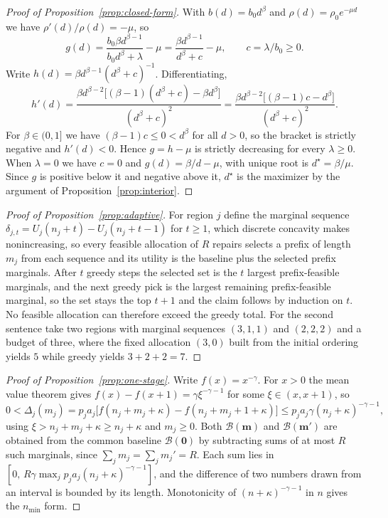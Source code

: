 \documentclass{article}
\begin{document}
\begin{proof}[Proof of Proposition~\ref{prop:closed-form}]
With $b(d)=b_0d^{\beta}$ and $\rho(d)=\rho_0e^{-\mu d}$ we have $\rho'(d)/\rho(d)=-\mu$, so
\[
g(d)=\frac{b_0\beta d^{\beta-1}}{b_0d^{\beta}+\lambda}-\mu=\frac{\beta d^{\beta-1}}{d^{\beta}+c}-\mu,\qquad c=\lambda/b_0\geq0.
\]
Write $h(d)=\beta d^{\beta-1}(d^{\beta}+c)^{-1}$. Differentiating,
\[
h'(d)=\frac{\beta d^{\beta-2}\bigl[(\beta-1)(d^{\beta}+c)-\beta d^{\beta}\bigr]}{(d^{\beta}+c)^{2}}=\frac{\beta d^{\beta-2}\bigl[(\beta-1)c-d^{\beta}\bigr]}{(d^{\beta}+c)^{2}}.
\]
For $\beta\in(0,1]$ we have $(\beta-1)c\leq0<d^{\beta}$ for all $d>0$, so the bracket is strictly negative and $h'(d)<0$. Hence $g=h-\mu$ is strictly decreasing for every $\lambda\geq0$. When $\lambda=0$ we have $c=0$ and $g(d)=\beta/d-\mu$, with unique root is $d^{\star}=\beta/\mu$. Since $g$ is positive below it and negative above it, $d^{\star}$ is the maximizer by the argument of Proposition~\ref{prop:interior}.
\end{proof}

\begin{proof}[Proof of Proposition~\ref{prop:adaptive}]
For region $j$ define the marginal sequence $\delta_{j,t}=U_j(n_j+t)-U_j(n_j+t-1)$ for $t\geq1$, which discrete concavity makes nonincreasing, so every feasible allocation of $R$ repairs selects a prefix of length $m_j$ from each sequence and its utility is the baseline plus the selected prefix marginals. After $t$ greedy steps the selected set is the $t$ largest prefix-feasible marginals, and the next greedy pick is the largest remaining prefix-feasible marginal, so the set stays the top $t+1$ and the claim follows by induction on $t$. No feasible allocation can therefore exceed the greedy total. For the second sentence take two regions with marginal sequences $(3,1,1)$ and $(2,2,2)$ and a budget of three, where the fixed allocation $(3,0)$ built from the initial ordering yields $5$ while greedy yields $3+2+2=7$.
\end{proof}

\begin{proof}[Proof of Proposition~\ref{prop:one-stage}]
Write $f(x)=x^{-\gamma}$. For $x>0$ the mean value theorem gives $f(x)-f(x+1)=\gamma\xi^{-\gamma-1}$ for some $\xi\in(x,x+1)$, so
\[
0<\Delta_j(m_j)=p_ja_j\bigl[f(n_j+m_j+\kappa)-f(n_j+m_j+1+\kappa)\bigr]\leq p_ja_j\gamma(n_j+\kappa)^{-\gamma-1},
\]
using $\xi>n_j+m_j+\kappa\geq n_j+\kappa$ and $m_j\geq0$. Both $\mathcal B(\mathbf m)$ and $\mathcal B(\mathbf m')$ are obtained from the common baseline $\mathcal B(\mathbf 0)$ by subtracting sums of at most $R$ such marginals, since $\sum_jm_j=\sum_jm_j'=R$. Each sum lies in $[0,\,R\gamma\max_jp_ja_j(n_j+\kappa)^{-\gamma-1}]$, and the difference of two numbers drawn from an interval is bounded by its length. Monotonicity of $(n+\kappa)^{-\gamma-1}$ in $n$ gives the $n_{\min}$ form.
\end{proof}
\end{document}
